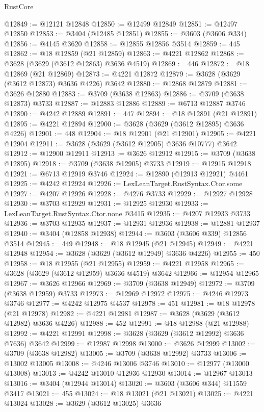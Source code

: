 \begin{lexlean}{RustCore}
\begin{coremodule}
@12849 := @12121 @12848
@12850 := @12499 @12849
@12851 := @12497 @12850
@12853 := @3404 (@12485 @12851)
@12855 := @3603 (@3606 @334)
@12856 := @4145 @3620
@12858 := @12855 @12856 @3514
@12859 := 445
@12862 := @18 @12859 (@21 @12859)
@12863 := @4221 @12862
@12868 := @3628 (@3629 (@3612 @12863) @3636 @4519)
@12869 := 446
@12872 := @18 @12869 (@21 @12869)
@12873 := @4221 @12872
@12879 := @3628 (@3629 (@3612 @12873) @3636 @4226) @3642
@12880 := @12868 @12879
@12881 := @3626 @12880
@12883 := @3709 (@3638 @12863)
@12886 := @3709 (@3638 @12873) @3733
@12887 := @12883 @12886
@12889 := @6713 @12887 @3746
@12890 := @4242 @12889
@12891 := 447
@12894 := @18 @12891 (@21 @12891)
@12895 := @4221 @12894
@12900 := @3628 (@3629 (@3612 @12895) @3636 @4226)
@12901 := 448
@12904 := @18 @12901 (@21 @12901)
@12905 := @4221 @12904
@12911 := @3628 (@3629 (@3612 @12905) @3636 @10777) @3642
@12912 := @12900 @12911
@12913 := @3626 @12912
@12915 := @3709 (@3638 @12895)
@12918 := @3709 (@3638 @12905) @3733
@12919 := @12915 @12918
@12921 := @6713 @12919 @3746
@12924 := @12890 (@12913 @12921) @4461
@12925 := @4242 @12924
@12926 := LexLeanTarget.RustSyntax.Ctor.some
@12927 := @4207 @12926
@12928 := @4276 @3733
@12929 := @12927 @12928
@12930 := @3703 @12929
@12931 := @12925 @12930
@12933 := LexLeanTarget.RustSyntax.Ctor.none @3415
@12935 := @4207 @12933 @3733
@12936 := @3703 @12935
@12937 := @12931 @12936
@12938 := @12881 @12937
@12940 := @3404 (@12858 @12938)
@12944 := @3603 (@3606 @339) @12856 @3514
@12945 := 449
@12948 := @18 @12945 (@21 @12945)
@12949 := @4221 @12948
@12954 := @3628 (@3629 (@3612 @12949) @3636 @4226)
@12955 := 450
@12958 := @18 @12955 (@21 @12955)
@12959 := @4221 @12958
@12965 := @3628 (@3629 (@3612 @12959) @3636 @4519) @3642
@12966 := @12954 @12965
@12967 := @3626 @12966
@12969 := @3709 (@3638 @12949)
@12972 := @3709 (@3638 @12959) @3733
@12973 := @12969 @12972
@12975 := @4246 @12973 @3746
@12977 := @4242 @12975 @4537
@12978 := 451
@12981 := @18 @12978 (@21 @12978)
@12982 := @4221 @12981
@12987 := @3628 (@3629 (@3612 @12982) @3636 @4226)
@12988 := 452
@12991 := @18 @12988 (@21 @12988)
@12992 := @4221 @12991
@12998 := @3628 (@3629 (@3612 @12992) @3636 @7636) @3642
@12999 := @12987 @12998
@13000 := @3626 @12999
@13002 := @3709 (@3638 @12982)
@13005 := @3709 (@3638 @12992) @3733
@13006 := @13002 @13005
@13008 := @4246 @13006 @3746
@13010 := @12977 (@13000 @13008)
@13013 := @4242 @13010 @12936 @12930
@13014 := @12967 @13013
@13016 := @3404 (@12944 @13014)
@13020 := @3603 (@3606 @344) @11559 @3417
@13021 := 455
@13024 := @18 @13021 (@21 @13021)
@13025 := @4221 @13024
@13028 := @3629 (@3612 @13025) @3636

\end{coremodule}
\end{lexlean}
